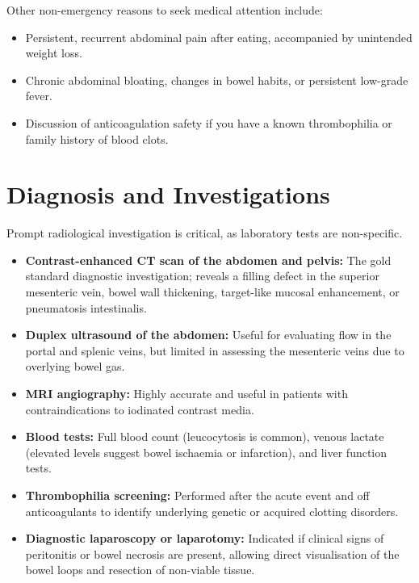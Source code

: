 Other non-emergency reasons to seek medical attention include:
\begin{itemize}
    \item Persistent, recurrent abdominal pain after eating, accompanied by unintended weight loss.
    \item Chronic abdominal bloating, changes in bowel habits, or persistent low-grade fever.
    \item Discussion of anticoagulation safety if you have a known thrombophilia or family history of blood clots.
\end{itemize}

\section*{Diagnosis and Investigations}
Prompt radiological investigation is critical, as laboratory tests are non-specific.
\begin{itemize}
    \item \textbf{Contrast-enhanced CT scan of the abdomen and pelvis:} The gold standard diagnostic investigation; reveals a filling defect in the superior mesenteric vein, bowel wall thickening, target-like mucosal enhancement, or pneumatosis intestinalis.
    \item \textbf{Duplex ultrasound of the abdomen:} Useful for evaluating flow in the portal and splenic veins, but limited in assessing the mesenteric veins due to overlying bowel gas.
    \item \textbf{MRI angiography:} Highly accurate and useful in patients with contraindications to iodinated contrast media.
    \item \textbf{Blood tests:} Full blood count (leucocytosis is common), venous lactate (elevated levels suggest bowel ischaemia or infarction), and liver function tests.
    \item \textbf{Thrombophilia screening:} Performed after the acute event and off anticoagulants to identify underlying genetic or acquired clotting disorders.
    \item \textbf{Diagnostic laparoscopy or laparotomy:} Indicated if clinical signs of peritonitis or bowel necrosis are present, allowing direct visualisation of the bowel loops and resection of non-viable tissue.
\end{itemize}

